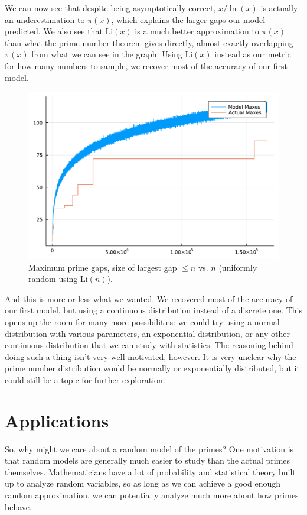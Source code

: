 \documentclass[conference]{IEEEtran}
\begin{document}
We can now see that despite being asymptotically correct,
$x/\ln(x)$ is actually an underestimation to
$\pi(x)$, which explains the larger gaps our model
predicted. We also see that $\mathrm{Li}(x)$ is a much
better approximation to $\pi(x)$ than what the prime
number theorem gives directly, almost exactly overlapping
$\pi(x)$ from what we can see in the graph. Using
$\mathrm{Li}(x)$ instead as our metric for how many
numbers to sample, we recover most of the accuracy of our
first model.

\begin{figure}[H]
  \centering
  \includegraphics[width=\linewidth,keepaspectratio]{random_model_li.pdf}
  \caption{Maximum prime gaps, size of largest gap $\le n$ vs. $n$ (uniformly random using $\mathrm{Li}(n)$).}
\end{figure}

And this is more or less what we wanted. We recovered
most of the accuracy of our first model, but using a
continuous distribution instead of a discrete one. This
opens up the room for many more possibilities: we could
try using a normal distribution with various parameters,
an exponential distribution, or any other continuous
distribution that we can study with statistics. The
reasoning behind doing such a thing isn't very
well-motivated, however.
It is very unclear why the prime number distribution would
be normally or exponentially distributed, but it could
still be a topic for further exploration.

\section{Applications}
So, why might we care about a random model of the primes?
One motivation is that random models are generally much
easier to study than the actual primes themselves.
Mathematicians have a lot of probability and statistical
theory built up to analyze random variables, so as long
as we can achieve a good enough random approximation, we
can potentially analyze much more about how primes behave.
\end{document}
